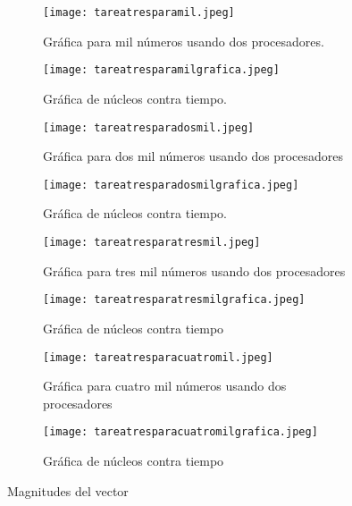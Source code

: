 \documentclass{article}
\begin{document}
\begin{figure}[H]
       \centering
       \begin{subfigure}[b]{0.45\linewidth}
           \texttt{[image: tareatresparamil.jpeg]}
           \caption{Gr\'afica para mil n\'umeros usando dos procesadores.}
           \label{fig:westminster_lateral}
        \end{subfigure}
        \begin{subfigure}[b]{0.45\linewidth}
            \texttt{[image: tareatresparamilgrafica.jpeg]}
            \caption{Gr\'afica de n\'ucleos contra tiempo.}
            \label{fig:westminster_aerea}
        \end{subfigure}
        \begin{subfigure}[b]{0.45\linewidth}
           \texttt{[image: tareatresparadosmil.jpeg]}
           \caption{Gr\'afica para dos mil n\'umeros usando dos procesadores}
           \label{fig:westminster_aerea}
        \end{subfigure}
        \begin{subfigure}[b]{0.45\linewidth}
           \texttt{[image: tareatresparadosmilgrafica.jpeg]}
           \caption{Gr\'afica de n\'ucleos contra tiempo.}
           \label{fig:westminster_aerea}
        \end{subfigure}
      \begin{subfigure}[b]{0.45\linewidth}
           \texttt{[image: tareatresparatresmil.jpeg]}
           \caption{Gr\'afica para tres mil n\'umeros usando dos procesadores}
           \label{fig:westminster_aerea}
        \end{subfigure}
\begin{subfigure}[b]{0.45\linewidth}
           \texttt{[image: tareatresparatresmilgrafica.jpeg]}
           \caption{Gr\'afica de n\'ucleos contra tiempo}
           \label{fig:westminster_aerea}
        \end{subfigure}
\begin{subfigure}[b]{0.45\linewidth}
           \texttt{[image: tareatresparacuatromil.jpeg]}
           \caption{Gr\'afica para cuatro mil n\'umeros usando dos procesadores}
           \label{fig:westminster_aerea}
        \end{subfigure}
\begin{subfigure}[b]{0.45\linewidth}
           \texttt{[image: tareatresparacuatromilgrafica.jpeg]}
           \caption{Gr\'afica de n\'ucleos contra tiempo}
           \label{fig:westminster_aerea}
        \end{subfigure}
        \caption{Magnitudes del vector}
        \label{fig:westminster}
\end{figure}
\end{document}
